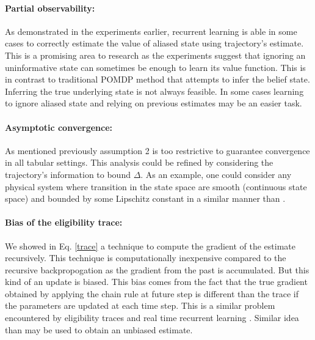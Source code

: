 \paragraph{Partial observability:} As demonstrated in the experiments earlier, recurrent learning is able in some cases to correctly estimate the value of aliased state using trajectory's estimate. This is a promising area to research as the experiments suggest that ignoring an uninformative state can sometimes be enough to learn its value function. This is in contrast to traditional POMDP method that attempts to infer the belief state. Inferring the true underlying state is not always feasible. In some cases learning to ignore aliased state and relying on previous estimates may be an easier task.
\paragraph{Asymptotic convergence:} As mentioned previously assumption 2 is too restrictive to guarantee convergence in all tabular settings. This analysis could be refined by considering the trajectory's information to bound $\Delta$. As an example, one could consider any physical system where transition in the state space are smooth (continuous state space) and bounded by some Lipschitz constant in a similar manner than \cite{shah2018q}. 
\paragraph{Bias of the eligibility trace:}
We showed in Eq. \eqref{trace} a technique to compute the gradient of the estimate recursively. This technique is computationally inexpensive compared to the recursive backpropogation as the gradient from the past is accumulated. But this kind of an update is biased. This bias comes from the fact that the true gradient obtained by applying the chain rule at future step is different than the trace if the parameters are updated at each time step. This is a similar problem encountered by eligibility traces \cite{seijen2014true} and real time recurrent learning \cite{williams1995gradient}. Similar idea than \cite{seijen2014true} may be used to obtain an unbiased estimate.
